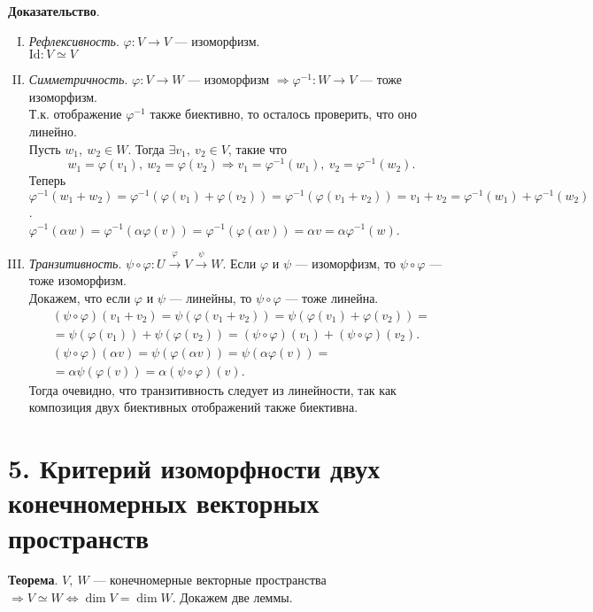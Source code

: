 \documentclass[a4paper, 12pt]{article}
\begin{document}
\textbf{Доказательство}.
\vspace{0mm}
\begin{enumerate}[I.]
\itemsep=-0.3em
\item \textit{Рефлексивность}. $\varphi: V \rightarrow V$ --- изоморфизм.\\
$\text{Id}: V \simeq V$
\item \textit{Симметричность}. $\varphi: V \rightarrow W$ --- изоморфизм $\Longrightarrow \varphi^{-1}: W \rightarrow V$ --- тоже изоморфизм. \\
Т.к. отображение $\varphi^{-1}$ также биективно, то осталось проверить, что оно линейно. \\
Пусть $w_1,\ w_2 \in W$. Тогда $\exists v_1,\ v_2 \in V$, такие что
\vspace{-3mm}
\[
w_1 = \varphi(v_1),\ w_2 = \varphi(v_2) \Rightarrow v_1 = \varphi^{-1}(w_1),\ v_2 = \varphi^{-1}(w_2).
\]
Теперь $\varphi^{-1}(w_1 + w_2) = \varphi^{-1}(\varphi(v_1) + \varphi(v_2)) = \varphi^{-1}(\varphi(v_1 + v_2)) = v_1 + v_2 = \varphi^{-1}(w_1) + \varphi^{-1}(w_2)$. \\
$\varphi^{-1}(\alpha w) = \varphi^{-1}(\alpha \varphi(v)) = \varphi^{-1}(\varphi(\alpha v)) = \alpha v = \alpha \varphi^{-1}(w)$.
\item \textit{Транзитивность}. $\psi \circ \varphi: U \xrightarrow{\varphi} V \xrightarrow{\psi} W$. Если $\varphi$ и $\psi$ --- изоморфизм, то $\psi \circ \varphi$ --- тоже изоморфизм. \\
Докажем, что если $\varphi$ и $\psi$ --- линейны, то $\psi \circ \varphi$ --- тоже линейна.
\vspace{-3mm}
\begin{gather*}
(\psi \circ \varphi)(v_1 + v_2) = \psi(\varphi(v_1 + v_2)) = \psi(\varphi(v_1) + \varphi(v_2)) = \\
= \psi(\varphi(v_1)) + \psi(\varphi(v_2)) = (\psi \circ \varphi)(v_1) + (\psi \circ \varphi)(v_2). \\
(\psi \circ \varphi)(\alpha v) = \psi(\varphi(\alpha v)) = \psi(\alpha \varphi(v)) = \\
= \alpha \psi(\varphi(v)) = \alpha(\psi \circ \varphi)(v).
\end{gather*}
Тогда очевидно, что транзитивность следует из линейности, так как композиция двух биективных отображений также биективна.
\end{enumerate}

\section*{5. Критерий изоморфности двух конечномерных векторных пространств}
\textbf{Теорема}. $V,\ W$ --- конечномерные векторные пространства $\Longrightarrow V \simeq W \Longleftrightarrow \dim V = \dim W$.
Докажем две леммы.
\end{document}

